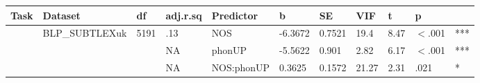 \begin{table}[ht]
\centering
\begingroup\normalsize
\begin{tabular}{lllllllllll}
  \hline
Task & Dataset & df & adj.r.sq & Predictor & b & SE & VIF & t & p &  \\ 
  \hline
 & BLP\_SUBTLEXuk & 5191 & .13 & NOS & -6.3672 & 0.7521 & 19.4 & 8.47 & $<$.001 & *** \\ 
   &  &  & NA & phonUP & -5.5622 & 0.901 & 2.82 & 6.17 & $<$.001 & *** \\ 
   &  &  & NA & NOS:phonUP & 0.3625 & 0.1572 & 21.27 & 2.31 & .021 & * \\ 
   \hline
\end{tabular}
\endgroup
\end{table}
